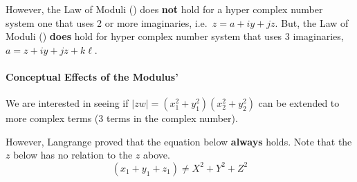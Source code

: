 However, the Law of Moduli () does \textbf{not} hold for a hyper complex number system one that uses 2 or more imaginaries, i.e.\ $z = a + iy + jz$.
But, the Law of Moduli () \textbf{does} hold for hyper complex number system that uses 3 imaginaries, $a = z + iy + jz + k \ell$.

\paragraph{Conceptual Effects of the Modulus' }\label{par:Law_of_Moduli-Conceptual_Effects}
We are interested in seeing if $\lvert z w \rvert = (x_{1}^{2} + y_{1}^{2})(x_{2}^{2}+y_{2}^{2})$ can be extended to more complex terms (3 terms in the complex number).

However, Langrange proved that the equation below \textbf{always} holds.
Note that the $z$ below has no relation to the $z$ above.
\begin{equation*}
  (x_{1} + y_{1} + z_{1}) \neq X^{2} + Y^{2} + Z^{2}
\end{equation*}

